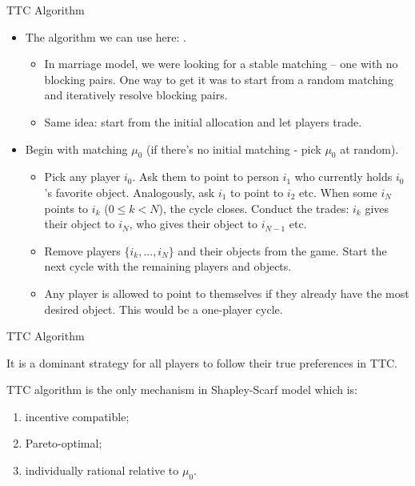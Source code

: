 \documentclass[english,10pt
,aspectratio=169
]{beamer}
\begin{document}
\begin{frame}{TTC Algorithm}
\begin{itemize}
	\item The algorithm we can use here: .
	\begin{itemize}
		\item In marriage model, we were looking for a stable matching -- one with no blocking pairs. One way to get it was to start from a random matching and iteratively resolve blocking pairs.
		\item Same idea: start from the initial allocation and let players trade.
	\end{itemize}
	\item Begin with matching $\mu_0$ (if there's no initial matching - pick $\mu_0$ at random).
	\begin{itemize}
		\item Pick any player $i_0$. Ask them to point to person $i_1$ who currently holds $i_0$'s favorite object. Analogously, ask $i_1$ to point to $i_2$ etc. When some $i_N$ points to $i_k$ ($0\leq k < N$), the cycle closes. Conduct the trades: $i_k$ gives their object to $i_N$, who gives their object to $i_{N-1}$ etc.
		\item Remove players $\{i_k,...,i_N\}$ and their objects from the game. Start the next cycle with the remaining players and objects.
		\item Any player is allowed to point to themselves if they already have the most desired object. This would be a one-player cycle.
	\end{itemize}
\end{itemize}
\end{frame}


\begin{frame}{TTC Algorithm}
\begin{theorem}[Roth '82]
	It is a dominant strategy for all players to follow their true preferences in TTC.
\end{theorem}
\begin{theorem}
	TTC algorithm is the only mechanism in Shapley-Scarf model which is:
	\begin{enumerate}
		\item incentive compatible;
		\item Pareto-optimal;
		\item individually rational relative to $\mu_0$.
	\end{enumerate}
\end{theorem}
\end{frame}
\end{document}
